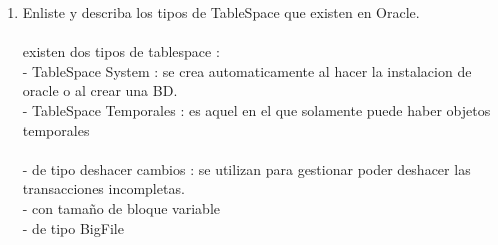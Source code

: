 \begin{enumerate}[1.]
	\item Enliste y describa los tipos de TableSpace que existen en Oracle.
	\\\\ existen dos tipos de tablespace :
	\\- TableSpace System	: se crea automaticamente al hacer la instalacion de oracle o al crear una BD.
	\\- TableSpace Temporales	: es aquel en el que solamente puede haber objetos temporales
	\\\\- de tipo deshacer cambios	: se utilizan para gestionar poder deshacer las transacciones incompletas.
	\\- con tamaño de bloque variable
	\\- de tipo BigFile	
	

\end{enumerate} 
